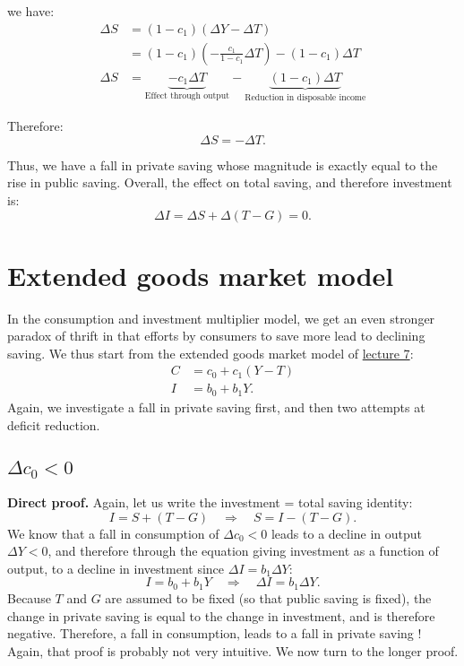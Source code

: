 \documentclass[]{book}
\theoremstyle{definition}
\theoremstyle{definition}
\theoremstyle{definition}
\theoremstyle{remark}
\begin{document}
we have: \[
\begin{aligned}
\Delta S    &=(1-c_{1})(\Delta Y-\Delta T)\\
    &=(1-c_{1})\left(-\frac{c_{1}}{1-c_{1}}\Delta T\right)-(1-c_{1})\Delta T\\
\Delta S    &=\underbrace{-c_{1}\Delta T}_{\text{Effect through output}}-\underbrace{(1-c_{1})\Delta T}_{\text{Reduction in disposable income}}
\end{aligned}
\]

Therefore: \[\Delta S=-\Delta T.\]

Thus, we have a fall in private saving whose magnitude is exactly equal
to the rise in public saving. Overall, the effect on total saving, and
therefore investment is: \[\Delta I  =\Delta S+\Delta(T-G)=0.\]

\hypertarget{extended}{\section{Extended goods market
model}\label{extended}}

In the consumption and investment multiplier model, we get an even
stronger paradox of thrift in that efforts by consumers to save more
lead to declining saving. We thus start from the extended goods market
model of \href{lecture7.html}{lecture 7}: \[
\begin{aligned}
C   &=c_{0}+c_{1}\left(Y-T\right)\\
I   &=b_{0}+b_{1}Y.
\end{aligned}
\] Again, we investigate a fall in private saving first, and then two
attempts at deficit reduction.

\subsection{\texorpdfstring{\(\Delta c_{0}<0\)}{\textbackslash{}Delta c\_\{0\}\textless{}0}}\label{delta-c_00-1}

\textbf{Direct proof.} Again, let us write the investment = total saving
identity:
\[I=S+\left(T-G\right)\quad\Rightarrow\quad S=I-\left(T-G\right).\] We
know that a fall in consumption of \(\Delta c_{0}<0\) leads to a decline
in output \(\Delta Y<0\), and therefore through the equation giving
investment as a function of output, to a decline in investment since
\(\Delta I=b_{1}\Delta Y\):
\[I=b_{0}+b_{1}Y\quad\Rightarrow\quad\Delta I=b_{1}\Delta Y.\] Because
\(T\) and \(G\) are assumed to be fixed (so that public saving is
fixed), the change in private saving is equal to the change in
investment, and is therefore negative. Therefore, a fall in consumption,
leads to a fall in private saving ! Again, that proof is probably not
very intuitive. We now turn to the longer proof.
\end{document}
